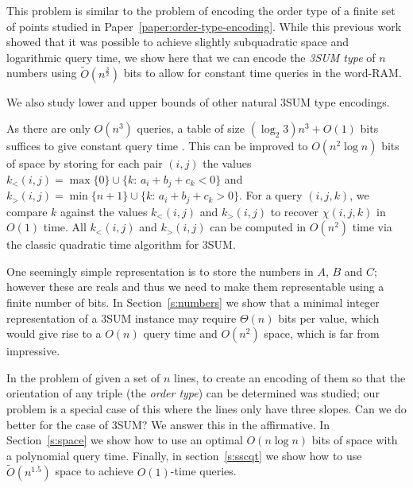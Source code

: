 This problem is similar to the problem of encoding the order
type of a finite set of points studied in Paper~\ref{paper:order-type-encoding}.
While this previous work showed that it was
possible to achieve slightly subquadratic space and logarithmic query time, we
show here that we can encode the \emph{3SUM type} of \(n\) numbers using
\(\tilde{O}(n^{\frac 32})\) bits to allow for constant time queries in the
word-RAM.

We also study lower and upper bounds of other natural 3SUM type encodings.

As there are only $O(n^3)$ queries, a table
of size $(\log_2 3) n^3 + O(1)$ bits suffices to give constant query time
\cite{DPT10}. This can be improved to $O(n^2\log n)$ bits of space by 
storing for each pair $(i,j)$ the values
\(k_<(i,j) = \max \{ 0\}\cup \{k \colon\, a_i + b_j + c_k < 0\}\) and
\(k_>(i,j) = \min \{ n+1\}\cup \{k \colon\, a_i + b_j + c_k > 0\}\).
For a query \((i,j,k)\), we compare \(k\) against the values \(k_<(i,j)\) and \(k_>(i,j)\)
to recover \(\chi(i,j,k)\) in \(O(1)\) time. All \(k_<(i,j)\) and \(k_>(i,j)\)
can be computed in \(O(n^2)\) time via the classic quadratic time algorithm for
3SUM.

One seemingly simple representation is to store the numbers in $A$, $B$ and
$C$; however these are reals and thus we need to make them representable using
a finite number of bits.
In Section~\ref{s:numbers} we show that a minimal integer representation of a
3SUM instance may require $\Theta(n)$ bits per value, which would give
rise to a $O(n)$ query time and $O(n^2)$ space, which is far from
impressive.
%


In \cite{CCILO18} the problem of given a set of $n$ lines, to create an
encoding of them so that the orientation of any triple (the \emph{order type})
can be determined was studied; our problem is a special case of this where the
lines only have three slopes.
Can we do better for the case of 3SUM? We answer this in the affirmative.
In Section~\ref{s:space} we show how to use an optimal $O(n \log n)$ bits of
space with a polynomial query time. Finally, in section~\ref{s:sscqt} we show
how to use $\tilde{O}(n^{1.5})$ space to achieve $O(1)$-time queries.



